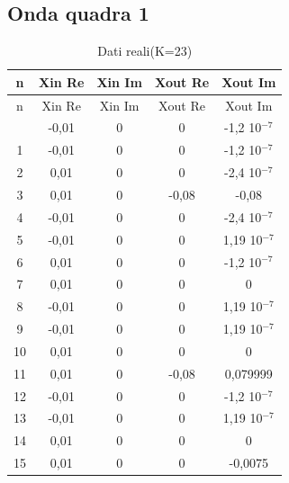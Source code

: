 \documentclass[a4paper, titlepage]{article}
\begin{document}
\subsection{Onda quadra 1}\label{tab:quadra1}
\begin{longtable}{*5c}
\caption{Dati reali(K=23)}
\label{}\\
\toprule
n & Xin Re & Xin Im & Xout Re & Xout Im \\
\midrule
\endfirsthead
n & Xin Re & Xin Im & Xout Re & Xout Im \\
\midrule
\endhead
\midrule
\endfoot
\bottomrule
\endlastfoot
0 & -0,01 & 0 & 0 & -1,2 10$^{-7}$\\
1 & -0,01   & 0 & 0 & -1,2 10$^{-7}$\\
2 & 0,01    & 0 & 0 & -2,4 10$^{-7}$\\
3 & 0,01   & 0 & -0,08 & -0,08 \\
4 & -0,01    & 0 & 0 & -2,4 10$^{-7}$\\
5 & -0,01    & 0 & 0 & 1,19 10$^{-7}$\\
6 & 0,01    & 0 & 0 & -1,2 10$^{-7}$\\
7 & 0,01    & 0 & 0 & 0\\
8 & -0,01    & 0 & 0 & 1,19 10$^{-7}$\\
9 & -0,01    & 0 & 0 & 1,19 10$^{-7}$\\
10& 0,01    & 0 & 0 & 0 \\
11& 0,01    & 0 & -0,08 & 0,079999\\
12& -0,01    & 0 & 0 & -1,2 10$^{-7}$\\
13& -0,01    & 0 & 0 & 1,19 10$^{-7}$\\
14& 0,01    & 0 & 0 & 0\\
15 & 0,01 & 0 & 0 & -0,0075 \\ 
\end{longtable}
\newpage
\end{document}
